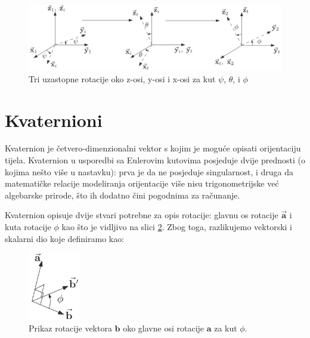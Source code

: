 \documentclass[times, utf8, diplomski, numeric]{templates/template}
\begin{document}
{{        \begin{figure}[htb]
        \centering
        \includegraphics[width=1.0\textwidth]{images/eulerovi_kutovi.jpg}
        \caption{Tri uzastopne rotacije oko z-osi, y-osi i x-osi za kut $\psi$, $\theta$, i $\phi$}
        \label{fig:euler_rotacija}
        \end{figure}
    }

    \section{Kvaternioni}{
        Kvaternion je četvero-dimenzionalni vektor s kojim je moguće opisati orijentaciju tijela. Kvaternion u usporedbi sa Eulerovim kutovima posjeduje dvije prednosti (o kojima nešto više u nastavku): prva je da ne posjeduje singularnost, i druga da matematičke relacije modeliranja orijentacije više nisu trigonometrijske već algebarske prirode, što ih dodatno čini pogodnima za računanje.

        Kvaternion opisuje dvije stvari potrebne za opis rotacije: glavnu os rotacije  $\overrightarrow{\boldsymbol{a}}$ i kuta rotacije $\phi$ kao što je vidljivo na slici \ref{fig:principal_axis_rotation}. Zbog toga, razlikujemo vektorski i skalarni dio koje definiramo kao:

        \begin{figure}[htb]
        \centering
        \includegraphics[width=0.2\textwidth]{images/principal_axis_rotation.png}
        \caption{Prikaz rotacije vektora $\boldsymbol{b}$ oko glavne osi rotacije $\boldsymbol{a}$ za kut $\phi$.}
        \label{fig:principal_axis_rotation}
        \end{figure}

}}
\end{document}
